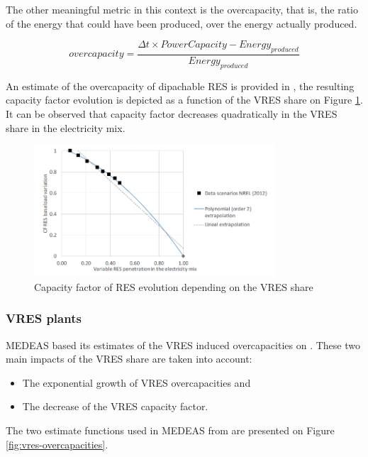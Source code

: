 The other meaningful metric in this context is the overcapacity, that is, the ratio of the energy that could have been produced, over the energy actually produced. %

\begin{equation}
    overcapacity = \frac{\Delta t \times PowerCapacity - Energy_{produced}}{Energy_{produced}}
    \label{equation:overcapacity}
\end{equation}

An estimate of the overcapacity of dipachable RES is provided in \cite{NREL}, the resulting capacity factor evolution is depicted as a function of the VRES share on Figure \ref{fig:cfres-vreshare}. It can be observed that capacity factor decreases quadratically in the VRES share in the electricity mix.

\begin{figure}[h]
    \includegraphics[width=0.8\textwidth]{resources/images/cfres-vreshsare.png}
    \caption{Capacity factor of RES evolution depending on the VRES share \cite{NREL}}
    \label{fig:cfres-vreshare}
\end{figure}

\subsubsection{VRES plants}

MEDEAS based its estimates of the VRES induced overcapacities on \cite{delarue}. These two main impacts of the VRES share are taken into account:
\begin{itemize}
    \item The exponential growth of VRES overcapacities and
    \item The decrease of the VRES capacity factor.
\end{itemize}

The two estimate functions used in MEDEAS \cite{medeas-eroi} from \cite{delarue} are presented on Figure \ref{fig:vres-overcapacities}.

